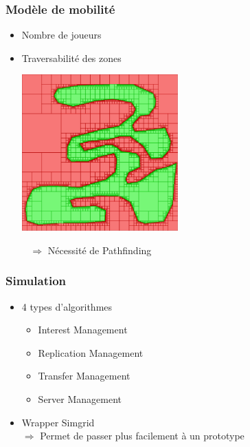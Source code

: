 \documentclass{beamer}
\begin{document}
\begin{frame}
  \frametitle{Modèle de mobilité}
  \begin{itemize}
    \item{Nombre de joueurs}
    \item{Traversabilité des zones
      \\[1mm]\begin{center}\includegraphics[width=6cm]{zones.png}\end{center}~
      \hspace{1cm}$\Rightarrow$ Nécessité de Pathfinding}
  \end{itemize}
\end{frame}

\begin{frame}
  \frametitle{Simulation}
  \begin{itemize}
    \item{4 types d'algorithmes}
    \begin{itemize}
      \item{Interest Management}
      \item{Replication Management}
      \item{Transfer Management}
      \item{Server Management\vspace{0.5cm}}
    \end{itemize}
    \item{Wrapper Simgrid\\[1mm]\hspace{1cm}$\Rightarrow$ Permet de passer plus facilement à un prototype}
  \end{itemize}
\end{frame}
\end{document}
